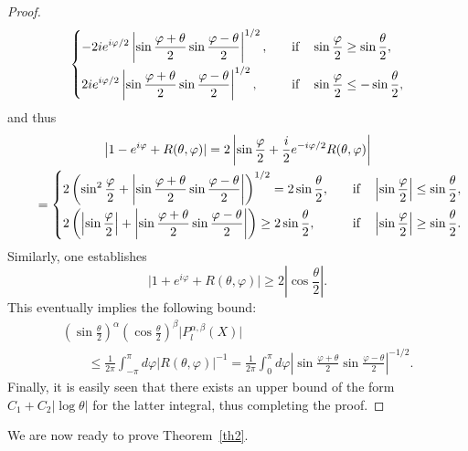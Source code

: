\documentclass[pdftex]{sigma}
\begin{document}
\begin{proof}
\[\begin{cases}
\displaystyle  -2i e^{i\varphi/2} \left|\sin\frac{\varphi+\theta}2 \sin\frac{\varphi-\theta}2\right|^{1/2},\quad  &
\displaystyle  \mbox{if}\quad \sin\frac\varphi2\geq\sin\frac\theta2 ,\vspace{1mm}\\
\displaystyle  2i e^{i\varphi/2} \left|\sin\frac{\varphi+\theta}2 \sin\frac{\varphi-\theta}2\right|^{1/2},\quad &
\displaystyle   \mbox{if}\quad \sin\frac\varphi2\leq-\sin\frac\theta2 ,
\end{cases}
\]
and thus
\begin{gather*}
\big|1-e^{i\varphi}+R(\theta,\varphi)|
 =2\left|\sin\frac\varphi2+\frac i2 e^{-i\varphi/2} R(\theta,\varphi)\right|\\
\qquad =\begin{cases}
\displaystyle 2\left(\sin^2\frac\varphi2+\left|\sin\frac{\varphi+\theta}2
\sin\frac{\varphi-\theta}2\right|\right)^{1/2}=2\sin\frac\theta2, \quad&
\displaystyle  \mbox{if}\quad
\left|\sin\frac\varphi2\right|\leq\sin\frac\theta2 ,\vspace{1mm}\\
\displaystyle  2\left(\left|\sin\frac\varphi2\right|+\left|\sin\frac{\varphi+\theta}2
\sin\frac{\varphi-\theta}2\right|\right)\geq2\sin\frac\theta2, \quad &
\displaystyle  \mbox{if}\quad
\left|\sin\frac\varphi2\right|\geq\sin\frac\theta2 .
\end{cases}
\end{gather*}
Similarly, one establishes
\[
\big|1+e^{i\varphi}+R(\theta,\varphi)|\geq2\left|\cos\frac\theta2\right| .
\]
This eventually implies the following bound:
\begin{gather*}
\left(\sin\frac\theta2\right)^\alpha \left(\cos\frac\theta2\right)^\beta
\big|P_l^{\alpha,\beta}(X)\big|\\
\qquad{} \leq \frac1{2\pi}\int_{-\pi}^\pi d\varphi
\big|R(\theta,\varphi)\big|^{-1}
=\frac1{2\pi}\int_0^\pi d\varphi
\left|\sin\frac{\varphi+\theta}2 \sin\frac{\varphi-\theta}2\right|^{-1/2}.
\end{gather*}
Finally, it is easily seen that there exists an upper bound of the
form $ C_1 + C_2 |\log\theta |$ for the latter integral, thus
completing the proof.
\end{proof}


We are now ready to prove Theorem~\ref{th2}.
\end{document}
